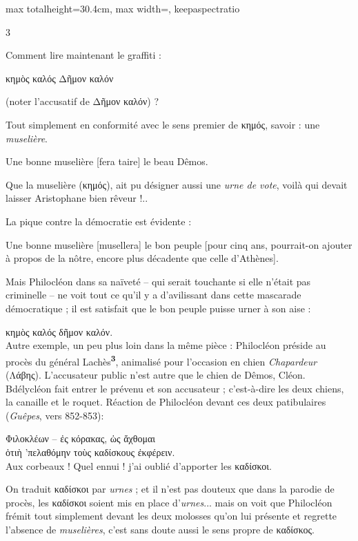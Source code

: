 \documentclass[11pt,twoside]{book}
\newcommand{\italique}[1]{\textit{#1}}
\newcommand{\citComm}[1]{\begin{quoting}[vskip=0.4pt,leftmargin=0.7em,rightmargin=0.2em]#1\end{quoting}}
\newcommand{\marqueur}[1]{\textsuperscript{\color{rubricRed}\textbf{#1}}}
\begin{document}
\begin{adjustbox}{max totalheight=30.4cm, max width=\textwidth, keepaspectratio}
\begin{minipage}{\textwidth}
{\begin{multicols}{3}
\par\vspace{1.5pt}
\noindent Comment lire maintenant le graffiti :
\citComm{κημὸς καλός Δῆμον καλόν}
\par\vspace{1.5pt}
\noindent (noter l'accusatif de Δῆμον καλόν) ?
\par\vspace{1.5pt}
\noindent Tout simplement en conformité avec le sens premier de κημός, savoir : une \italique{muselière}.
\citComm{Une bonne muselière [fera taire] le beau Dêmos.}
\par\vspace{1.5pt}
\noindent Que la muselière (κημός), ait pu désigner aussi une \italique{urne de vote}, voilà qui devait laisser Aristophane bien rêveur !..
\par\vspace{1.5pt}
\noindent La pique contre la démocratie est évidente :
\citComm{Une bonne muselière [musellera] le bon peuple [pour cinq ans, pourrait-on ajouter à propos de la nôtre, encore plus décadente que celle d'Athènes].}
\par\vspace{1.5pt}
\noindent Mais Philocléon dans sa naïveté -- qui serait touchante si elle n'était pas criminelle -- ne voit tout ce qu'il y a d'avilissant dans cette mascarade démocratique ; il est satisfait que le bon peuple puisse urner à son aise :
\par\vspace{1.5pt}
\noindent κημὸς καλός δῆμον καλόν.\\ Autre exemple, un peu plus loin dans la même pièce : Philocléon préside au procès du général Lachès\marqueur{3}, animalisé pour l'occasion en chien \italique{Chapardeur} (Λάβης). L'accusateur public n'est autre que le chien de Dêmos, Cléon. Bdélycléon fait entrer le prévenu et son accusateur ; c'est-à-dire les deux chiens, la canaille et le roquet. Réaction de Philocléon devant ces deux patibulaires (\italique{Guêpes}, vers 852-853):
\citComm{Φιλοκλέων -- ἐς κόρακας, ὡς ἄχθομαι\\
ὁτιὴ 'πελαθόμην τοὺς καδίσκους ἐκφέρειν.\\
Aux corbeaux ! Quel ennui ! j'ai oublié d'apporter les καδίσκοι.}
\par\vspace{1.5pt}
\noindent On traduit καδίσκοι par \italique{urnes} ; et il n'est pas douteux que dans la parodie de procès, les καδίσκοι soient mis en place d'\italique{urnes}... mais on voit que Philocléon frémit tout simplement devant les deux molosses qu'on lui présente et regrette l'absence de \italique{muselières}, c'est sans doute aussi le sens propre de καδίσκος.\\

\end{multicols}}
\end{minipage}
\end{adjustbox}
\end{document}
